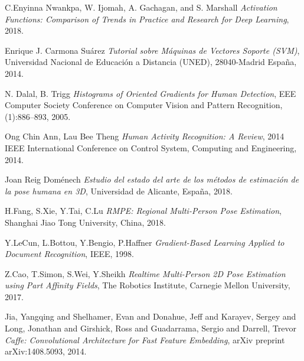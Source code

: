 \documentclass[a4paper,12pt,oneside,spanish]{book}
\begin{document}
\begin{thebibliography}{9}
	C.Enyinna Nwankpa, W. Ijomah, A. Gachagan, and S. Marshall \textit{Activation Functions: Comparison of Trends in	Practice and Research for Deep Learning}, 2018.	
	
	Enrique J. Carmona Suárez \textit{Tutorial sobre Máquinas de Vectores Soporte (SVM)}, Universidad Nacional de Educación a Distancia (UNED), 28040-Madrid España, 2014.	
	
	N. Dalal, B. Trigg \textit{Histograms of Oriented Gradients for Human Detection}, EEE Computer Society Conference on Computer Vision and Pattern Recognition, (1):886–893, 2005.	
	
	Ong Chin Ann, Lau Bee Theng \textit{Human Activity Recognition: A Review}, 2014 IEEE International Conference on Control System, Computing and Engineering, 2014.
	
	Joan Reig Doménech \textit{Estudio del estado del arte de los métodos de estimación de la pose humana en 3D}, Universidad de Alicante, España, 2018.
	
	H.Fang, S.Xie, Y.Tai, C.Lu \textit{RMPE: Regional Multi-Person Pose Estimation}, Shanghai Jiao Tong University, China, 2018.
	
	Y.LeCun, L.Bottou, Y.Bengio, P.Haffner \textit{Gradient-Based Learning Applied to Document Recognition}, IEEE, 1998.
	
	Z.Cao, T.Simon, S.Wei, Y.Sheikh \textit{Realtime Multi-Person 2D Pose Estimation using Part Affinity Fields}, The Robotics Institute, Carnegie Mellon University, 2017.

	Jia, Yangqing and Shelhamer, Evan and Donahue, Jeff and Karayev, Sergey and Long, Jonathan and Girshick, Ross and Guadarrama, Sergio and Darrell, Trevor \textit{Caffe: Convolutional Architecture for Fast Feature Embedding}, arXiv preprint arXiv:1408.5093, 2014.
	
\end{thebibliography}
\end{document}
